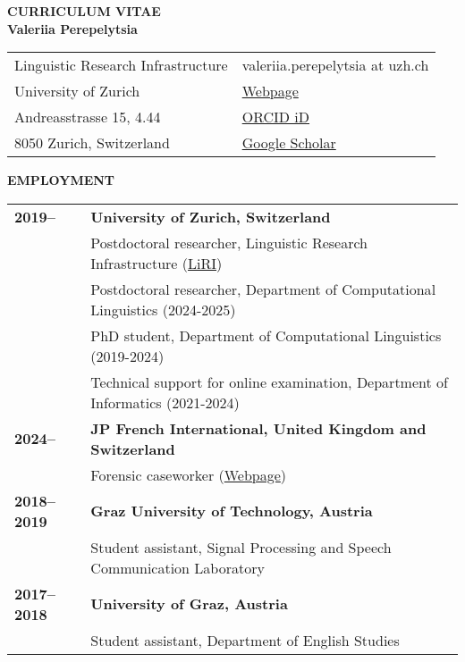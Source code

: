 \documentclass[11pt]{article}
\begin{document}
\begin{center}
{\bf CURRICULUM VITAE\\Valeriia Perepelytsia}\\
\vskip 12pt






\begin{tabular}{ll}
Linguistic Research Infrastructure   & valeriia.perepelytsia at uzh.ch \\
University of Zurich & \href{https://www.liri.uzh.ch/en/aboutus/Valeriia-Perepelytsia.html}{Webpage} \\ 
Andreasstrasse 15, 4.44 & \href{https://orcid.org/0009-0003-3355-9580}{ORCID iD} \\
8050 Zurich, Switzerland & \href{https://scholar.google.com/citations?user=9IiY_w8AAAAJ&hl=ru}{Google Scholar} \\
\end{tabular}
\end{center}





\vskip 12pt
\begin{flushleft}
{\bf EMPLOYMENT}
\end{flushleft}
\begin{tabular}{lp{5.5in}}
\bf 2019-- & {\bf University of Zurich, Switzerland} \\
& Postdoctoral researcher, Linguistic Research Infrastructure (\href{https://www.liri.uzh.ch/}{LiRI}) \\
& Postdoctoral researcher, Department of Computational Linguistics (2024-2025) \\
& PhD student, Department of Computational Linguistics (2019-2024) \\
& Technical support for online examination, Department of Informatics (2021-2024) \\
\bf 2024-- & {\bf JP French International, United Kingdom and Switzerland} \\
& Forensic caseworker (\href{https://www.jpfrench.com/valeriia-perepelytsia-4/}{Webpage}) \\
\bf 2018--2019 & {\bf Graz University of Technology, Austria} \\
& Student assistant, Signal Processing and Speech Communication Laboratory \\
\bf 2017--2018 & {\bf University of Graz, Austria} \\
& Student assistant, Department of English Studies \\
\end{tabular}
\end{document}
